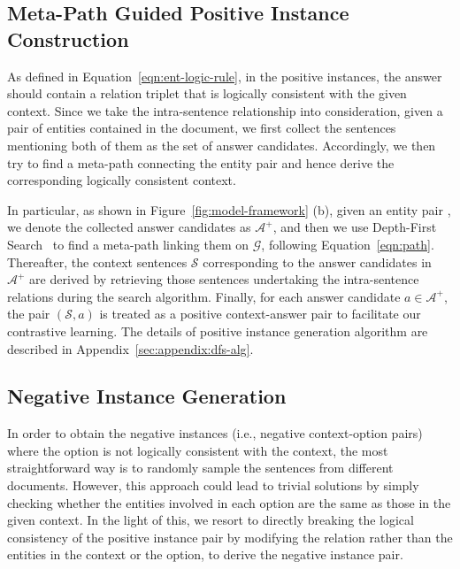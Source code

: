 \subsection{Meta-Path Guided Positive Instance Construction}
\label{sec:method:meta-path}



























As defined in Equation~\ref{eqn:ent-logic-rule}, in the positive instances, the answer should contain a relation triplet that is logically consistent with the given context. 
Since we take the intra-sentence relationship into consideration, given a pair of entities contained in the document,
we first collect the sentences mentioning both of them as the set of answer candidates.
Accordingly, we then try to find a meta-path connecting the entity pair and hence derive the corresponding logically consistent context. 


In particular, as shown in Figure~\ref{fig:model-framework} (b), given an entity pair , we denote the collected answer candidates as $\mathcal{A}^+$,
and then we use Depth-First Search~\citep{dfs-Tarjan72} to find a meta-path linking them on $\mathcal{G}$, following Equation~\ref{eqn:path}.
Thereafter, the context sentences $\mathcal{S}$ corresponding to the answer candidates in $\mathcal{A}^+$ are derived by retrieving those sentences undertaking the intra-sentence relations during the search algorithm.
Finally, for each answer candidate $a\in\mathcal{A}^+$, the pair $(\mathcal{S}, a)$ is treated as a positive context-answer pair to facilitate our contrastive learning.
The details of positive instance generation algorithm are described in Appendix~\ref{sec:appendix:dfs-alg}.


\subsection{Negative Instance Generation}
\label{sec:method:data-construction}



In order to obtain the negative instances (i.e., negative context-option pairs) where the option is not logically consistent with the context,
the most straightforward way is to randomly sample the sentences from different documents.
However, this approach could lead to trivial solutions by simply checking whether the entities involved in each option are the same as those in the given context.
In the light of this, we resort to directly breaking the logical consistency of the positive instance pair by modifying the relation rather than the entities in the context or the option, to derive the negative instance pair. 



